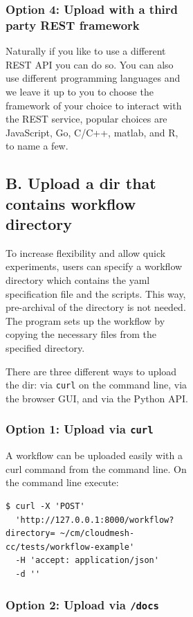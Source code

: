 \begin{figure}[htb]
\begin{figure}[htb]
\begin{figure}[htb]
\subsubsection{Option 4: Upload with a third party REST
framework}\label{option-4-upload-with-a-third-party-rest-framework}

Naturally if you like to use a different REST API you can do so. You can
also use different programming languages and we leave it up to you to
choose the framework of your choice to interact with the REST service,
popular choices are JavaScript, Go, C/C++, matlab, and R, to name a few.

\subsection{B. Upload a dir that contains workflow
directory}\label{b.-upload-a-dir-that-contains-workflow-directory}

To increase flexibility and allow quick experiments, users can specify a
workflow directory which contains the yaml specification file and the
scripts. This way, pre-archival of the directory is not needed. The
program sets up the workflow by copying the necessary files from the
specified directory.

There are three different ways to upload the dir: via \texttt{curl} on
the command line, via the browser GUI, and via the Python API.

\subsubsection{\texorpdfstring{Option 1: Upload via
\texttt{curl}}{Option 1: Upload via curl}}\label{option-1-upload-via-curl-1}

A workflow can be uploaded easily with a curl command from the command
line. On the command line execute:

\smallskip
\begin{verbatim}
$ curl -X 'POST' 
  'http://127.0.0.1:8000/workflow?directory= ~/cm/cloudmesh-cc/tests/workflow-example' 
  -H 'accept: application/json' 
  -d ''
\end{verbatim}
\smallskip

\subsubsection{\texorpdfstring{Option 2: Upload via
\texttt{/docs}}{Option 2: Upload via /docs}}\label{option-2-upload-via-docs-1}


\end{figure}
\end{figure}
\end{figure}
